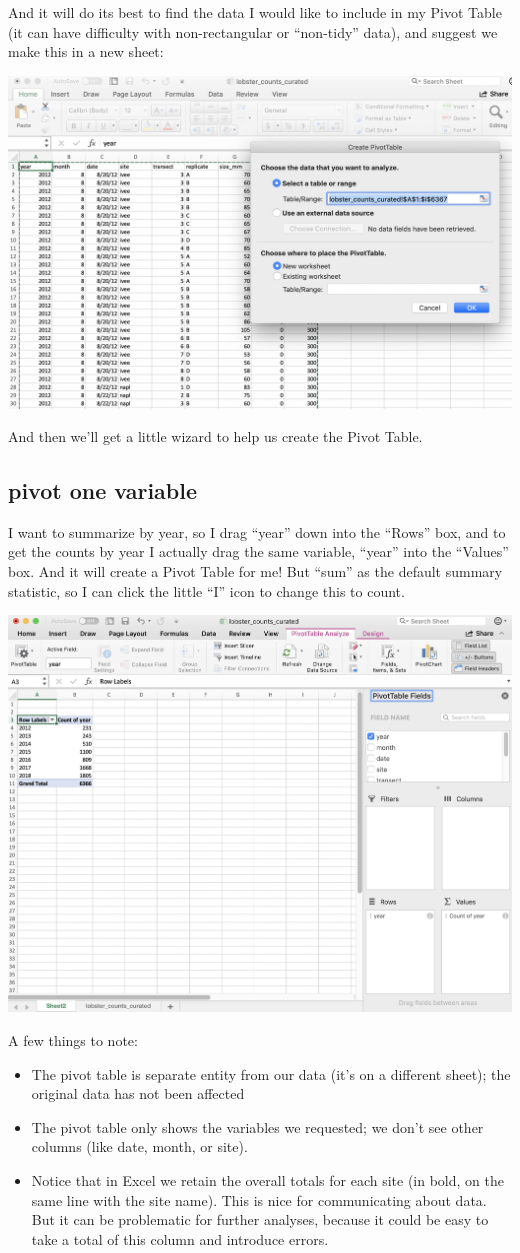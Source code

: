 \documentclass[]{book}
\providecommand{\tightlist}{%
  \setlength{\itemsep}{0pt}\setlength{\parskip}{0pt}}
\begin{document}
And it will do its best to find the data I would like to include in my Pivot Table (it can have difficulty with non-rectangular or ``non-tidy'' data), and suggest we make this in a new sheet:

\includegraphics[width=0.6\linewidth]{img/pivot-table-create}

And then we'll get a little wizard to help us create the Pivot Table.

\hypertarget{pivot-one-variable}{%
\subsection{pivot one variable}\label{pivot-one-variable}}

I want to summarize by year, so I drag ``year'' down into the ``Rows'' box, and to get the counts by year I actually drag the same variable, ``year'' into the ``Values'' box. And it will create a Pivot Table for me! But ``sum'' as the default summary statistic, so I can click the little ``I'' icon to change this to count.

\includegraphics[width=0.6\linewidth]{img/pivot-table-count-year}

A few things to note:

\begin{itemize}
\tightlist
\item
  The pivot table is separate entity from our data (it's on a different sheet); the original data has not been affected
\item
  The pivot table only shows the variables we requested; we don't see other columns (like date, month, or site).
\item
  Notice that in Excel we retain the overall totals for each site (in bold, on the same line with the site name). This is nice for communicating about data. But it can be problematic for further analyses, because it could be easy to take a total of this column and introduce errors.
\end{itemize}
\end{document}
